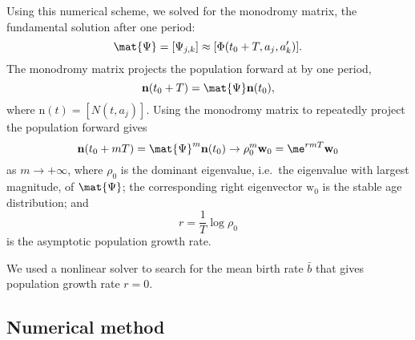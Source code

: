 \documentclass{jpmarticle}
\renewcommand{\vec}[1]{\boldsymbol{\mathrm{#1}}}
\begin{document}
Using this numerical scheme, we solved for the monodromy matrix, the
fundamental solution after one period:
\begin{equation}
  \mat{\Psi} = [\Psi_{j, k}] \approx [\Phi(t_0 + T, a_j, a'_k)].
\end{equation}
The monodromy matrix projects the population forward at by one period,
\begin{equation}
  \vec{n}(t_0 + T) = \mat{\Psi} \vec{n}(t_0),
\end{equation}
where $\vec{n}(t) = [N(t, a_j)]$.
Using the monodromy matrix to repeatedly project the population
forward gives
\begin{equation}
  \vec{n}(t_0 + m T)
  = \mat{\Psi}^m \vec{n}(t_0)
  \to \rho_0^m \vec{w}_0
  = \me^{r m T} \vec{w}_0
\end{equation}
as $m \to +\infty$, where $\rho_0$ is the dominant eigenvalue,
i.e.~the eigenvalue with largest magnitude, of $\mat{\Psi}$;
the corresponding right eigenvector $\vec{w}_0$ is the stable age
distribution; and
\begin{equation}
  r = \frac{1}{T} \log \rho_0
\end{equation}
is the asymptotic population growth rate.

We used a nonlinear solver to search for the mean birth rate $\bar{b}$
that gives population growth rate $r = 0$.


\subsection{Numerical method}
\end{document}
